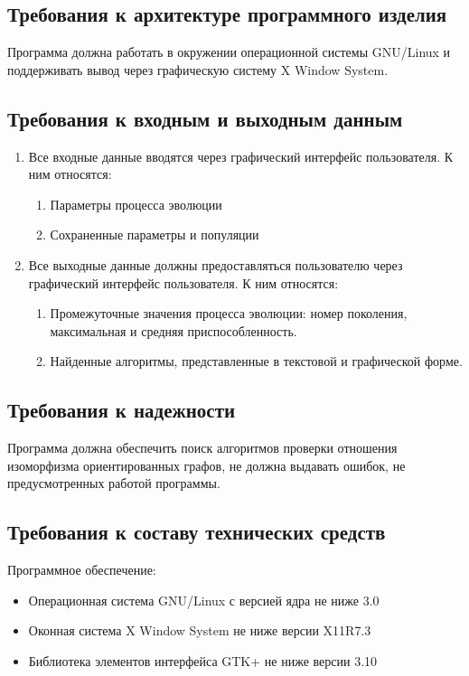\documentclass[russian,utf8,emptystyle]{eskdtext}
\begin{document}
\subsection{Требования к архитектуре программного изделия}
Программа должна работать в окружении операционной системы GNU/Linux и поддерживать вывод через графическую систему X Window System.

\subsection{Требования к входным и выходным данным}
\begin{enumerate}
\item Все входные данные вводятся через графический интерфейс пользователя. К ним относятся:
\begin{enumerate}
\item Параметры процесса эволюции
\item Сохраненные параметры и популяции
\end{enumerate}
\item Все выходные данные должны предоставляться пользователю через графический интерфейс пользователя. К ним относятся:
\begin{enumerate}
\item Промежуточные значения процесса эволюции: номер поколения, максимальная и средняя приспособленность.
\item Найденные алгоритмы, представленные в текстовой и графической форме.
\end{enumerate}
\end{enumerate}

\subsection{Требования к надежности}
Программа должна обеспечить поиск алгоритмов проверки отношения изоморфизма ориентированных графов, не должна выдавать ошибок, не предусмотренных работой программы.

\subsection{Требования к составу технических средств}
Программное обеспечение:
\begin{itemize}
\item Операционная система GNU/Linux с версией ядра не ниже 3.0
\item Оконная система X Window System не ниже версии X11R7.3
\item Библиотека элементов интерфейса GTK+ не ниже версии 3.10
\end{itemize}
\end{document}

